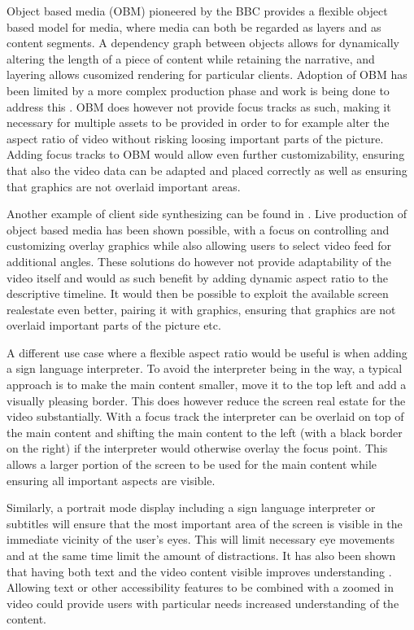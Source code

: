 \documentclass[sigconf, review=true]{acmart}
\begin{document}
Object based media (OBM) pioneered by the BBC provides a flexible object based
model for media, where media can both be regarded as layers and as content
segments. A dependency graph between objects allows for dynamically altering
the length of a piece of content while retaining the narrative, and layering
allows cusomized rendering for particular clients. Adoption of OBM has been
limited by a more complex production phase and work is being done to address
this \cite{8352916}. OBM does however not provide focus tracks as such,
making it necessary for multiple assets to be provided in order to for
example alter the aspect ratio of video without risking loosing important
parts of the picture. Adding focus tracks to OBM would allow even further
customizability, ensuring that also the video data can be adapted and placed
correctly as well as ensuring that graphics are not overlaid important
areas.

Another example of client side synthesizing can be found in \cite
{JIT_video}. Live production of object based media has been shown possible,
with a focus on controlling and customizing overlay graphics while also
allowing users to select video feed for additional angles\cite
{10.1145/3209280.3209528}. These solutions do however not provide
adaptability of the video itself and would as such benefit by adding dynamic
aspect ratio to the descriptive timeline. It would then be possible to
exploit the available screen realestate even better, pairing it with
graphics, ensuring that graphics are not overlaid important parts of the
picture etc.

A different use case where a flexible aspect ratio would be useful is when
adding a sign language interpreter. To avoid the interpreter being in the
way, a typical approach is to make the main content smaller, move it to the
top left and add a visually pleasing border. This does however reduce the
screen real estate for the video substantially. With a focus track the
interpreter can be overlaid on top of the main content and shifting the main
content to the left (with a black border on the right) if the interpreter
would otherwise overlay the focus point. This allows a larger portion of the
screen to be used for the main content while ensuring all important aspects
are visible.

Similarly, a portrait mode display including a sign language interpreter or
subtitles will ensure that the most important area of the screen is visible
in the immediate vicinity of the user's eyes. This will limit necessary eye
movements and at the same time limit the amount of distractions. It has also
been shown that having both text and the video content visible improves
understanding \cite{eyetracking}. Allowing text or other accessibility
features to be combined with a zoomed in video could provide users with
particular needs increased understanding of the content.
\end{document}
